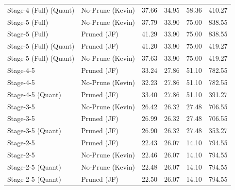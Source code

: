 \begin{table}
\begin{tabular}{llrrrr}
Stage-4 (Full)
(Quant) & No-Prune (Kevin) & 37.66 & 34.95 & 58.36 & 410.27 \\
Stage-5 (Full) & No-Prune (Kevin) & 37.79 & 33.90 & 75.00 & 838.55 \\
Stage-5 (Full) & Pruned (JF) & 41.29 & 33.90 & 75.00 & 838.55 \\
Stage-5 (Full)
(Quant) & Pruned (JF) & 41.20 & 33.90 & 75.00 & 419.27 \\
Stage-5 (Full)
(Quant) & No-Prune (Kevin) & 37.63 & 33.90 & 75.00 & 419.27 \\
Stage-4-5 & Pruned (JF) & 33.24 & 27.86 & 51.10 & 782.55 \\
Stage-4-5 & No-Prune (Kevin) & 32.23 & 27.86 & 51.10 & 782.55 \\
Stage-4-5
(Quant) & Pruned (JF) & 33.40 & 27.86 & 51.10 & 391.27 \\
Stage-3-5 & No-Prune (Kevin) & 26.42 & 26.32 & 27.48 & 706.55 \\
Stage-3-5 & Pruned (JF) & 26.99 & 26.32 & 27.48 & 706.55 \\
Stage-3-5
(Quant) & Pruned (JF) & 26.90 & 26.32 & 27.48 & 353.27 \\
Stage-2-5 & Pruned (JF) & 22.43 & 26.07 & 14.10 & 794.55 \\
Stage-2-5 & No-Prune (Kevin) & 22.46 & 26.07 & 14.10 & 794.55 \\
Stage-2-5
(Quant) & No-Prune (Kevin) & 22.48 & 26.07 & 14.10 & 794.55 \\
Stage-2-5
(Quant) & Pruned (JF) & 22.50 & 26.07 & 14.10 & 794.55 \\
\bottomrule
\end{tabular}
\end{table}
